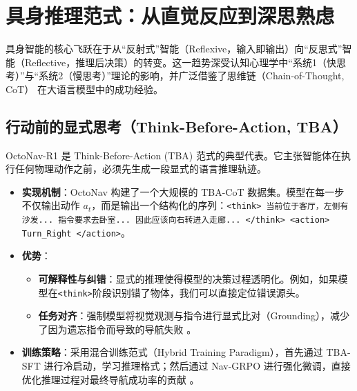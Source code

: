 \section{具身推理范式：从直觉反应到深思熟虑}
具身智能的核心飞跃在于从“反射式”智能（Reflexive，输入即输出）向“反思式”智能（Reflective，推理后决策）的转变。这一趋势深受认知心理学中“系统1（快思考）”与“系统2（慢思考）”理论的影响，并广泛借鉴了思维链（Chain-of-Thought, CoT）\cite{wei2022chain} 在大语言模型中的成功经验。

\subsection{行动前的显式思考（Think-Before-Action, TBA）}
OctoNav-R1   是 Think-Before-Action (TBA) 范式的典型代表。它主张智能体在执行任何物理动作之前，必须先生成一段显式的语言推理轨迹。
\begin{itemize}
    \item \textbf{实现机制}：OctoNav 构建了一个大规模的 TBA-CoT 数据集。模型在每一步不仅输出动作 $a_t$，而是输出一个结构化的序列：\texttt{<think> 当前位于客厅，左侧有沙发... 指令要求去卧室... 因此应该向右转进入走廊... </think> <action> Turn\_Right </action>}。
    \item \textbf{优势}：
    \begin{itemize}
        \item \textbf{可解释性与纠错}：显式的推理使得模型的决策过程透明化。例如，如果模型在\texttt{<think>}阶段识别错了物体，我们可以直接定位错误源头。
        \item \textbf{任务对齐}：强制模型将视觉观测与指令进行显式比对（Grounding），减少了因为遗忘指令而导致的导航失败  。
    \end{itemize}
    \item \textbf{训练策略}：采用混合训练范式（Hybrid Training Paradigm），首先通过 TBA-SFT 进行冷启动，学习推理格式；然后通过 Nav-GRPO 进行强化微调，直接优化推理过程对最终导航成功率的贡献  。
\end{itemize}


